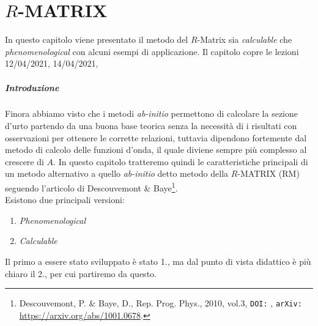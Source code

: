 \chapter{$R$-MATRIX}\label{sec-R-mat}
In questo capitolo viene presentato il metodo del $R$-Matrix sia \textit{calculable} che \textit{phenomenological} con alcuni esempi di applicazione. Il capitolo copre le lezioni 12/04/2021, 14/04/2021, 

\paragraph{Introduzione} Finora abbiamo visto che i metodi \textit{ab-initio} permettono di calcolare la sezione d'urto partendo da una buona base teorica senza la necessità di  i risultati con osservazioni per ottenere le corrette relazioni, tuttavia dipendono fortemente dal metodo di calcolo delle funzioni d'onda, il quale diviene sempre più complesso al crescere di $A$. In questo capitolo tratteremo quindi le caratteristiche principali di un metodo alternativo a quello \textit{ab-initio} detto metodo della $R$-MATRIX (RM) seguendo l'articolo di Descouvemont \& Baye\footnote{\label{0412_art} Descouvemont, P. \& Baye, D., Rep. Prog. Phys., 2010, vol.3, \texttt{DOI:} , \texttt{arXiv:} \url{https://arxiv.org/abs/1001.0678}.}.\\ 
Esistono due principali versioni:
\begin{enumerate}
	\item \textit{Phenomenological}
	\item \textit{Calculable}
\end{enumerate}
Il primo a essere stato sviluppato è stato 1., ma dal punto di vista didattico è più chiaro il 2., per cui partiremo da questo.

